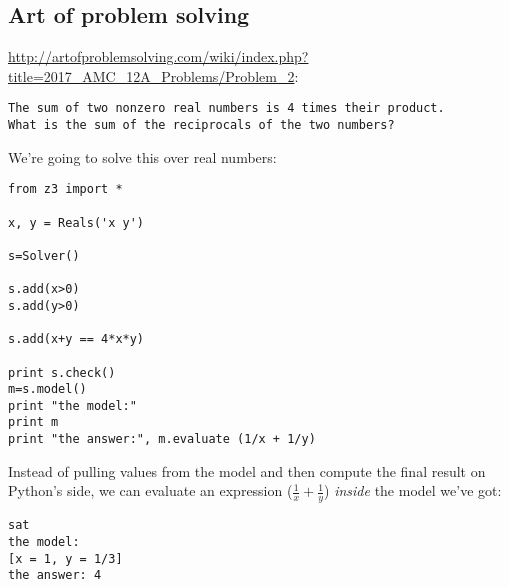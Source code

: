 \subsection{Art of problem solving}

\url{http://artofproblemsolving.com/wiki/index.php?title=2017_AMC_12A_Problems/Problem_2}:

\begin{lstlisting}
The sum of two nonzero real numbers is 4 times their product.
What is the sum of the reciprocals of the two numbers? 
\end{lstlisting}

We're going to solve this over real numbers:

\begin{lstlisting}[style=custompy]
from z3 import *

x, y = Reals('x y')

s=Solver()

s.add(x>0)
s.add(y>0)

s.add(x+y == 4*x*y)

print s.check()
m=s.model()
print "the model:"
print m
print "the answer:", m.evaluate (1/x + 1/y)
\end{lstlisting}

Instead of pulling values from the model and then compute the final result on Python's side, we can evaluate
an expression ($\frac{1}{x} + \frac{1}{y}$) \textit{inside} the model we've got:

\begin{lstlisting}
sat
the model:
[x = 1, y = 1/3]
the answer: 4
\end{lstlisting}

